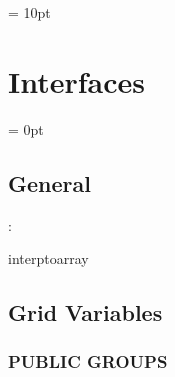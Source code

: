 \vspace{0.5cm}\parskip = 10pt 

\section{Interfaces} 


\parskip = 0pt

\vspace{3mm} \subsection*{General}

: 

interptoarray
\vspace{2mm}
\subsection*{Grid Variables}
\vspace{5mm}\subsubsection{PUBLIC GROUPS}

\vspace{5mm}

